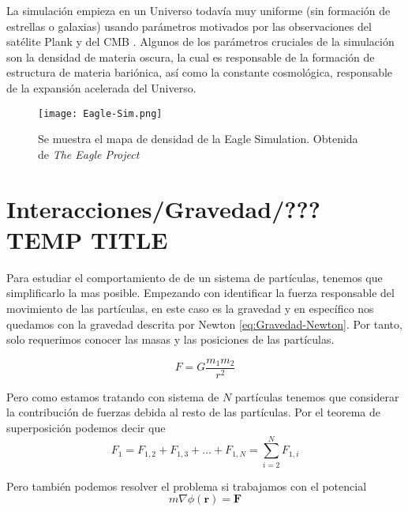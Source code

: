 La simulación empieza en un Universo todavía muy uniforme (sin formación de estrellas o galaxias) usando parámetros motivados por las observaciones del satélite Plank y del CMB \cite{ 2013ApJS..208...20B, 2020A&A...641A...1P}. Algunos de los parámetros cruciales de la simulación son la densidad de materia oscura, la cual es responsable de la formación de estructura de materia bariónica, así como la constante cosmológica, responsable de la expansión acelerada del Universo.
       
\begin{figure}[H]
    \centering
    \texttt{[image: Eagle-Sim.png]}
    \caption[Eagle Simulation Cosmic Web]{Se muestra el mapa de densidad de la Eagle Simulation. Obtenida de \textit{The Eagle Project} }
    \label{fig:Eagle_Sim}
\end{figure}


\section{Interacciones/Gravedad/??? TEMP TITLE}

Para estudiar el comportamiento de de un sistema de partículas, tenemos que simplificarlo la mas posible. Empezando con identificar la fuerza responsable del movimiento de las partículas, en este caso es la gravedad y en específico nos quedamos con la gravedad descrita por Newton \eqref{eq:Gravedad-Newton}. Por tanto, solo requerimos conocer las masas y las posiciones de las partículas.

\begin{equation}
    F = G \frac{m_1 m_2}{r^2}
    \label{eq:Gravedad-Newton}
\end{equation}

Pero como estamos tratando con sistema de $N$ partículas tenemos que considerar la contribución de fuerzas debida al resto de las partículas. Por el teorema de superposición podemos decir que
\begin{equation}
    F_{1} = F_{1,2} +F_{1,3} + \dots + F_{1,N} = \sum_{i=2}^{N} F_{1,i} 
    \label{eq:superposicion}
\end{equation}

Pero también podemos resolver el problema si trabajamos con el potencial
\begin{equation}
    m\nabla \phi(\mathbf{r}) = \mathbf{F}
    \label{eq:potencial-gravitacional}
\end{equation}



